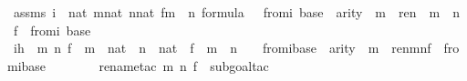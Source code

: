 \begin{isabellebody}
\ assms{}{\isacharcolon}{\kern0pt}\ {\isachardoublequoteopen}i\ {\isasymin}\ nat{\isachardoublequoteclose}\ {\isachardoublequoteopen}{\isasymforall}m{\isasymin}nat{\isachardot}{\kern0pt}\ {\isasymforall}n{\isasymin}nat{\isachardot}{\kern0pt}\ {\isasymforall}f{\isasymin}m\ {\isasymrightarrow}\ n{\isachardot}{\kern0pt}\ {\isasymforall}{\isasymphi}{\isasymin}formula{\isachardot}{\kern0pt}\ {\isasymphi}\ {\isasymin}\ {\isasymDelta}{}{\isacharunderscore}{\kern0pt}from{\isacharcircum}{\kern0pt}i\ {\isacharparenleft}{\kern0pt}{\isasymDelta}{}{\isacharunderscore}{\kern0pt}base{\isacharparenright}{\kern0pt}\ {\isasymlongrightarrow}\ arity{\isacharparenleft}{\kern0pt}{\isasymphi}{\isacharparenright}{\kern0pt}\ {\isasymle}\ m\ {\isasymlongrightarrow}\ ren{\isacharparenleft}{\kern0pt}{\isasymphi}{\isacharparenright}{\kern0pt}\ {\isacharbackquote}{\kern0pt}\ m\ {\isacharbackquote}{\kern0pt}\ n\ {\isacharbackquote}{\kern0pt}\ f\ {\isasymin}\ {\isasymDelta}{}{\isacharunderscore}{\kern0pt}from{\isacharcircum}{\kern0pt}i\ {\isacharparenleft}{\kern0pt}{\isasymDelta}{}{\isacharunderscore}{\kern0pt}base{\isacharparenright}{\kern0pt}{\isachardoublequoteclose}\isanewline
\isanewline
\ \ \ \ \isamarkupfalse%
\ ih\ {\isacharcolon}{\kern0pt}\ {\isachardoublequoteopen}{\isasymAnd}m\ n\ f\ {\isasymphi}{\isachardot}{\kern0pt}\ m\ {\isasymin}\ nat\ {\isasymLongrightarrow}\ n\ {\isasymin}\ nat\ {\isasymLongrightarrow}\ f\ {\isasymin}\ m\ {\isasymrightarrow}\ n\ {\isasymLongrightarrow}\ {\isasymphi}\ {\isasymin}\ {\isasymDelta}{}{\isacharunderscore}{\kern0pt}from{\isacharcircum}{\kern0pt}i{\isacharparenleft}{\kern0pt}{\isasymDelta}{}{\isacharunderscore}{\kern0pt}base{\isacharparenright}{\kern0pt}\ {\isasymLongrightarrow}\ arity{\isacharparenleft}{\kern0pt}{\isasymphi}{\isacharparenright}{\kern0pt}\ {\isasymle}\ m\ {\isasymLongrightarrow}\ ren{\isacharparenleft}{\kern0pt}{\isasymphi}{\isacharparenright}{\kern0pt}{\isacharbackquote}{\kern0pt}m{\isacharbackquote}{\kern0pt}n{\isacharbackquote}{\kern0pt}f\ {\isasymin}\ {\isasymDelta}{}{\isacharunderscore}{\kern0pt}from{\isacharcircum}{\kern0pt}i{\isacharparenleft}{\kern0pt}{\isasymDelta}{}{\isacharunderscore}{\kern0pt}base{\isacharparenright}{\kern0pt}{\isachardoublequoteclose}\ \isanewline
\ \ \ \ \ \ \isamarkupfalse%
{\isacharparenleft}{\kern0pt}rename{\isacharunderscore}{\kern0pt}tac\ m\ n\ f\ {\isasymphi}{\isacharcomma}{\kern0pt}\ subgoal{\isacharunderscore}{\kern0pt}tac\ {\isachardoublequoteopen}{\isasymphi}\ {\isasymin}\ {\isasymDelta}{}{\isachardoublequoteclose}{\isacharparenright}{\kern0pt}\isanewline

\end{isabellebody}
